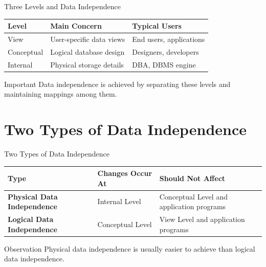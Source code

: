 \documentclass[aspectratio=169,11pt]{beamer}
\begin{document}
\begin{frame}{Three Levels and Data Independence}
\begin{center}
\begin{tabular}{lll}
\toprule
\textbf{Level} & \textbf{Main Concern} & \textbf{Typical Users} \\
\midrule
View & User-specific data views & End users, applications \\
Conceptual & Logical database design & Designers, developers \\
Internal & Physical storage details & DBA, DBMS engine \\
\bottomrule
\end{tabular}
\end{center}

\vspace{0.3cm}
\begin{alertblock}{Important}
Data independence is achieved by separating these levels and maintaining mappings among them.
\end{alertblock}
\end{frame}

\section{Two Types of Data Independence}

\begin{frame}{Two Types of Data Independence}
\begin{center}
\small
\begin{tabularx}{\textwidth}{>{\bfseries}lXX}
\toprule
Type & Changes Occur At & Should Not Affect \\
\midrule
Physical Data Independence & Internal Level & Conceptual Level and application programs \\
Logical Data Independence & Conceptual Level & View Level and application programs \\
\bottomrule
\end{tabularx}
\end{center}

\vspace{0.3cm}
\begin{block}{Observation}
Physical data independence is usually easier to achieve than logical data independence.
\end{block}
\end{frame}
\end{document}
